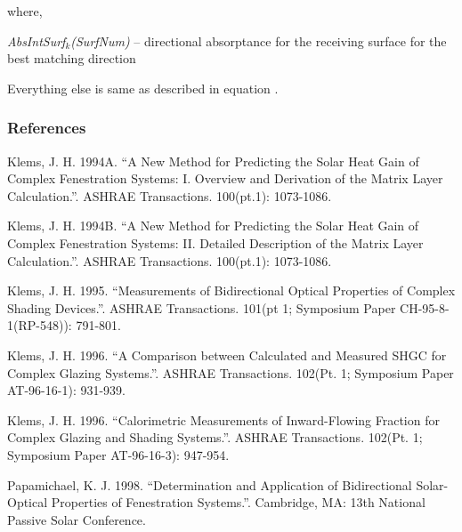 where,

\emph{AbsIntSurf\(_{k}\)(SurfNum)} -- directional absorptance for the receiving surface for the best matching direction

Everything else is same as described in equation .

\subsubsection{References}\label{references-1-018}

Klems, J. H. 1994A. ``A New Method for Predicting the Solar Heat Gain of Complex Fenestration Systems: I. Overview and Derivation of the Matrix Layer Calculation.''. ASHRAE Transactions. 100(pt.1): 1073-1086.

Klems, J. H. 1994B. ``A New Method for Predicting the Solar Heat Gain of Complex Fenestration Systems: II. Detailed Description of the Matrix Layer Calculation.''. ASHRAE Transactions. 100(pt.1): 1073-1086.

Klems, J. H. 1995. ``Measurements of Bidirectional Optical Properties of Complex Shading Devices.''. ASHRAE Transactions. 101(pt 1; Symposium Paper CH-95-8-1(RP-548)): 791-801.

Klems, J. H. 1996. ``A Comparison between Calculated and Measured SHGC for Complex Glazing Systems.''. ASHRAE Transactions. 102(Pt. 1; Symposium Paper AT-96-16-1): 931-939.

Klems, J. H. 1996. ``Calorimetric Measurements of Inward-Flowing Fraction for Complex Glazing and Shading Systems.''. ASHRAE Transactions. 102(Pt. 1; Symposium Paper AT-96-16-3): 947-954.

Papamichael, K. J. 1998. ``Determination and Application of Bidirectional Solar-Optical Properties of Fenestration Systems.''. Cambridge, MA: 13th National Passive Solar Conference.
